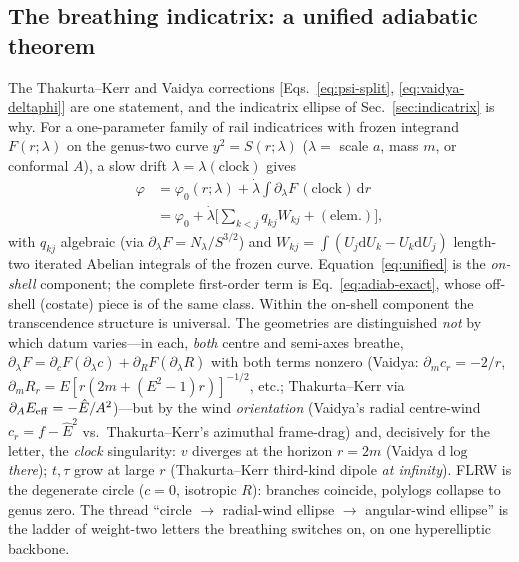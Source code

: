 \documentclass[
    aps, prd, twocolumn, superscriptaddress,
    showpacs, nofootinbib, floatfix
]{revtex4-2}
\newcommand{\Ehat}{\hat E}
\newcommand{\dd}{\mathrm{d}}
\begin{document}
\subsection{The breathing indicatrix: a unified adiabatic theorem}
\label{sec:unified}
The Thakurta--Kerr and Vaidya corrections [Eqs.~\eqref{eq:psi-split},
\eqref{eq:vaidya-deltaphi}] are one statement, and the indicatrix ellipse of
Sec.~\ref{sec:indicatrix} is why. For a one-parameter family of rail indicatrices
with frozen integrand $F(r;\lambda)$ on the genus-two curve $y^2=S(r;\lambda)$
($\lambda=$ scale $a$, mass $m$, or conformal $A$), a slow drift
$\lambda=\lambda(\text{clock})$ gives
\begin{equation}
\begin{split}
    \varphi&=\varphi_0(r;\lambda)+\dot\lambda\!\int\!\partial_\lambda F\,
    (\text{clock})\,\dd r\\
    &=\varphi_0+\dot\lambda\Big[\sum_{k<j} q_{kj}W_{kj}+(\text{elem.})\Big],
\end{split}
    \label{eq:unified}
\end{equation}
with $q_{kj}$ algebraic (via $\partial_\lambda F=N_\lambda/S^{3/2}$) and
$W_{kj}=\int(U_j\dd U_k-U_k\dd U_j)$ length-two iterated Abelian integrals of the frozen
curve. Equation~\eqref{eq:unified} is the \emph{on-shell} component; the complete
first-order term is Eq.~\eqref{eq:adiab-exact}, whose off-shell (costate) piece is of
the same class. Within the on-shell component the transcendence structure is universal. The geometries are distinguished \emph{not}
by which datum varies---in each, \emph{both} centre and semi-axes breathe,
$\partial_\lambda F=\partial_c F(\partial_\lambda c)+\partial_R F(\partial_\lambda
R)$ with both terms nonzero (Vaidya: $\partial_m c_r=-2/r$,
$\partial_m R_r=E[r(2m+(E^2-1)r)]^{-1/2}$, etc.; Thakurta--Kerr via
$\partial_A E_{\rm eff}=-\Ehat/A^2$)---but by the wind \emph{orientation} (Vaidya's
radial centre-wind $c_r=f-\Ehat^2$ vs.\ Thakurta--Kerr's azimuthal frame-drag) and,
decisively for the letter, the \emph{clock} singularity: $v$ diverges at the horizon
$r=2m$ (Vaidya $\dd\log$ \emph{there}); $t,\tau$ grow at large $r$ (Thakurta--Kerr
third-kind dipole \emph{at infinity}). FLRW is the degenerate circle ($c=0$,
isotropic $R$): branches coincide, polylogs collapse to genus zero. The thread ``circle $\to$
radial-wind ellipse $\to$ angular-wind ellipse'' is the ladder of weight-two letters
the breathing switches on, on one hyperelliptic backbone.
\end{document}
